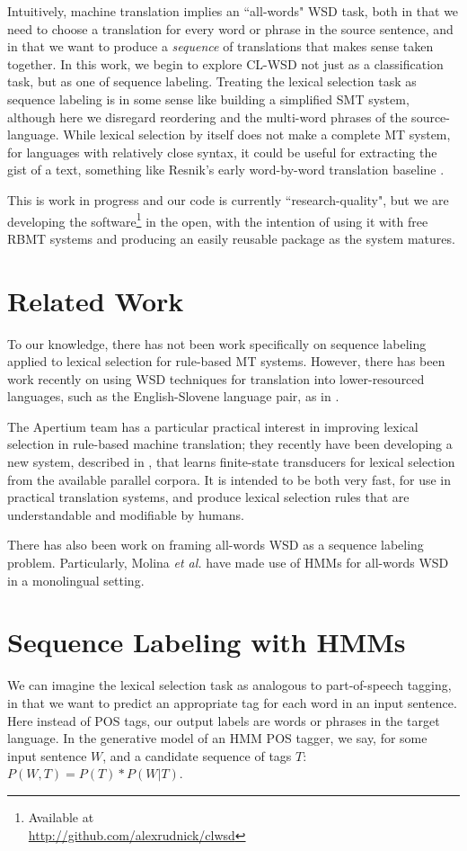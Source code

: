 \documentclass[11pt]{article}
\begin{document}
Intuitively, machine translation implies an ``all-words" WSD task, both in that
we need to choose a translation for every word or phrase in the source
sentence, and in that we want to produce a \emph{sequence} of translations that
makes sense taken together. In this work, we begin to explore CL-WSD not just
as a classification task, but as one of sequence labeling. Treating the lexical
selection task as sequence labeling is in some sense like building a simplified
SMT system, although here we disregard reordering and the multi-word phrases of
the source-language.  While lexical selection by itself does not make a
complete MT system, for languages with relatively close syntax, it could be
useful for extracting the gist of a text, something like Resnik's early
word-by-word translation baseline \cite{resnik:aaai}.

This is work in progress and our code is currently ``research-quality", but we
are developing the software\footnote{Available at \\
\url{http://github.com/alexrudnick/clwsd}} in the open, with the intention of
using it with free RBMT systems and producing an easily reusable package as the
system matures.

\section{Related Work}
To our knowledge, there has not been work specifically on sequence labeling
applied to lexical selection for rule-based MT systems. However, 
there has been work recently on using WSD techniques for translation into
lower-resourced languages, such as the English-Slovene language pair, as in 
\cite{vintar-fivser-vrvsvcaj:2012:ESIRMT-HyTra2012}. 

The Apertium team has a particular practical interest in improving lexical
selection in rule-based machine translation; they recently have been developing
a new system, described in \cite{tyers-fst}, that learns finite-state
transducers for lexical selection from the available parallel corpora. It is
intended to be both very fast, for use in practical translation systems, and
produce lexical selection rules that are understandable and modifiable by
humans.

There has also been work on framing all-words WSD as a sequence labeling
problem. Particularly, Molina \textit{et al.}
 have made use of HMMs for all-words
WSD in a monolingual setting.

\section{Sequence Labeling with HMMs}
We can imagine the lexical selection task as analogous to part-of-speech
tagging, in that we want to predict an appropriate tag for each word in an
input sentence. Here instead of POS tags, our output labels are words or
phrases in the target language. In the generative model of an HMM POS tagger,
we say, for some input sentence $W$, and a candidate sequence of tags $T$:
$ P(W, T) = P(T) * P(W|T) $.
\end{document}

